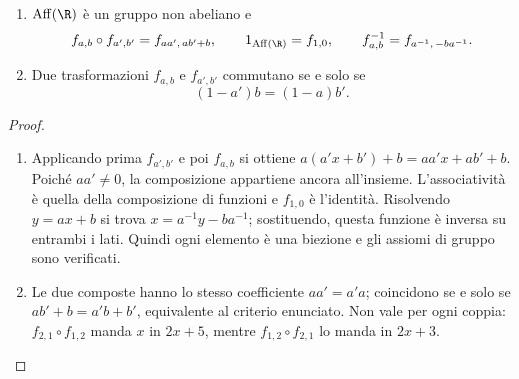 \begin{proposizione}\label{prop:affini}
\begin{enumerate}[label=\arabic*.]
\item $\operatorname{Aff}(\R)$ è un gruppo non abeliano e
\[
f_{a,b}\circ f_{a',b'}=f_{aa',\,ab'+b},\qquad
1_{\operatorname{Aff}(\R)}=f_{1,0},\qquad
f_{a,b}^{-1}=f_{a^{-1},\,-ba^{-1}}.
\]
\item Due trasformazioni $f_{a,b}$ e $f_{a',b'}$ commutano se e solo se
\[
(1-a')b=(1-a)b'.
\]
\end{enumerate}
\end{proposizione}
\begin{proof}
\begin{enumerate}[label=\arabic*.]
\item Applicando prima $f_{a',b'}$ e poi $f_{a,b}$ si ottiene $a(a'x+b')+b=aa'x+ab'+b$. Poiché $aa'\ne0$, la composizione appartiene ancora all'insieme. L'associatività è quella della composizione di funzioni e $f_{1,0}$ è l'identità. Risolvendo $y=ax+b$ si trova $x=a^{-1}y-ba^{-1}$; sostituendo, questa funzione è inversa su entrambi i lati. Quindi ogni elemento è una biezione e gli assiomi di gruppo sono verificati.
\item Le due composte hanno lo stesso coefficiente $aa'=a'a$; coincidono se e solo se $ab'+b=a'b+b'$, equivalente al criterio enunciato. Non vale per ogni coppia: $f_{2,1}\circ f_{1,2}$ manda $x$ in $2x+5$, mentre $f_{1,2}\circ f_{2,1}$ lo manda in $2x+3$.
\end{enumerate}
\end{proof}
